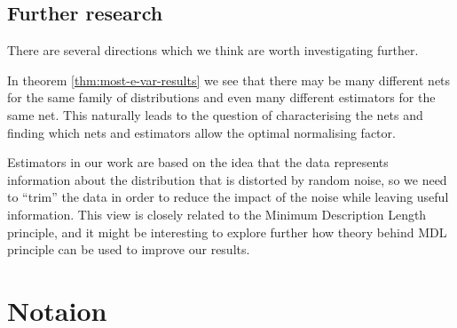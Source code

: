\documentclass{article}
\theoremstyle{definition}
\theoremstyle{definition}
\begin{document}
\subsection{Further research}

There are several directions which we think are worth investigating further.

In theorem \ref{thm:most-e-var-results} we see that there may be many different nets for the same family of distributions and even many different estimators for the same net. This naturally leads to the question of characterising the nets and finding which nets and estimators allow the optimal normalising factor.

Estimators in our work are based on the idea that the data represents information about the distribution that is distorted by random noise, so we need to ``trim'' the data in order to reduce the impact of the noise while leaving useful information. This view is closely related to the Minimum Description Length principle, and it might be interesting to explore further how theory behind MDL principle can be used to improve our results.


%
\printbibliography

\appendix


\section{Notaion}
\end{document}

